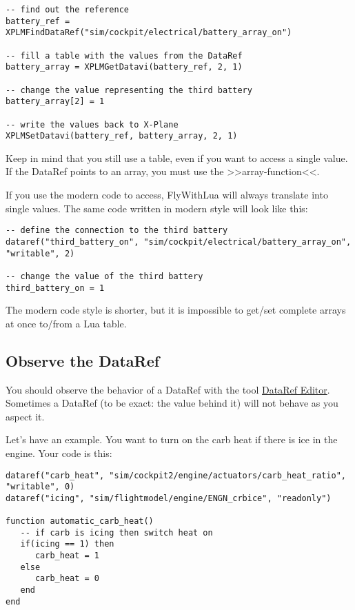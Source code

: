 \documentclass[11pt,parskip=half,a4paper]{scrartcl}
\begin{document}
\begin{lstlisting}
-- find out the reference
battery_ref = XPLMFindDataRef("sim/cockpit/electrical/battery_array_on")

-- fill a table with the values from the DataRef
battery_array = XPLMGetDatavi(battery_ref, 2, 1)

-- change the value representing the third battery
battery_array[2] = 1

-- write the values back to X-Plane
XPLMSetDatavi(battery_ref, battery_array, 2, 1)
\end{lstlisting}

Keep in mind that you still use a table, even if you want to access a single value. If the DataRef points to an array, you must use the >>array-function<<.

If you use the modern code to access, FlyWithLua will always translate into single values. The same code written in modern style will look like this:

\begin{lstlisting}
-- define the connection to the third battery
dataref("third_battery_on", "sim/cockpit/electrical/battery_array_on", "writable", 2)

-- change the value of the third battery
third_battery_on = 1
\end{lstlisting}

The modern code style is shorter, but it is impossible to get/set complete arrays at once to/from a Lua table.

\subsection{Observe the DataRef}

You should observe the behavior of a DataRef with the tool \href{http://wiki.x-plane.com/DataRefEditor}{DataRef Editor}. Sometimes a DataRef (to be exact: the value behind it) will not behave as you aspect it.

Let's have an example. You want to turn on the carb heat if there is ice in the engine. Your code is this:

\begin{lstlisting}
dataref("carb_heat", "sim/cockpit2/engine/actuators/carb_heat_ratio", "writable", 0)
dataref("icing", "sim/flightmodel/engine/ENGN_crbice", "readonly")

function automatic_carb_heat()
   -- if carb is icing then switch heat on 
   if(icing == 1) then
      carb_heat = 1
   else
      carb_heat = 0
   end	
end
\end{lstlisting}
\end{document}
